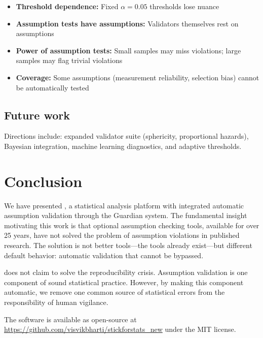 \documentclass[article]{jss}
\begin{document}
\begin{itemize}
\item \textbf{Threshold dependence:} Fixed $\alpha = 0.05$ thresholds lose nuance
\item \textbf{Assumption tests have assumptions:} Validators themselves rest on assumptions
\item \textbf{Power of assumption tests:} Small samples may miss violations; large samples may flag trivial violations
\item \textbf{Coverage:} Some assumptions (measurement reliability, selection bias) cannot be automatically tested
\end{itemize}

\subsection{Future work}

Directions include: expanded validator suite (sphericity, proportional hazards), Bayesian integration, machine learning diagnostics, and adaptive thresholds.


\section{Conclusion} \label{sec:conclusion}

We have presented , a statistical analysis platform with integrated automatic assumption validation through the Guardian system. The fundamental insight motivating this work is that optional assumption checking tools, available for over 25 years, have not solved the problem of assumption violations in published research. The solution is not better tools---the tools already exist---but different default behavior: automatic validation that cannot be bypassed.

 does not claim to solve the reproducibility crisis. Assumption validation is one component of sound statistical practice. However, by making this component automatic, we remove one common source of statistical errors from the responsibility of human vigilance.

The software is available as open-source at \url{https://github.com/visvikbharti/stickforstats_new} under the MIT license.
\end{document}
